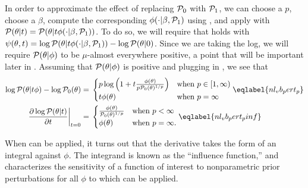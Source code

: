 In order to approximate the effect of replacing $\mathcal{P}_{0}$ with $\mathcal{P}_{1}$, we can
choose a $p$, choose a $\beta$, compute the corresponding $\phi(\cdot \vert
\beta, \mathcal{P}_{1})$ using , and apply  with
$\mathcal{P}(\theta \vert t) = \mathcal{P}(\theta \vert t \phi(\cdot \vert \beta, \mathcal{P}_{1}))$. To
do so, we will require that  holds with $\psi(\theta, t) =
\log \mathcal{P}(\theta \vert t \phi(\cdot \vert \beta, \mathcal{P}_{1})) - \log \mathcal{P}(\theta \vert
0)$.  Since we are taking the log, we will require $\mathcal{P}(\theta \vert \phi)$
to be $\mu$-almost everywhere positive, a point that will be important later in
. Assuming that $\mathcal{P}(\theta \vert \phi)$ is positive and
plugging in , we see that
%
\begin{align}
%
\logp(\theta \vert \t \phi) - \log \pbase(\theta) ={}&
\begin{cases}
    p \log\left(1 + \t \frac{\phi(\theta)}{p \pbase(\theta)^{1/p}}\right)
    & \textrm{when }p \in [1, \infty) \\
    \t \phi(\theta)
    & \textrm{when }p = \infty
%
\end{cases}  \eqlabel{nl_vb_pert_p}\\
%
\fracat{\partial \log \p(\theta \vert \t)}{\partial \t}{\t=0} ={}&
\begin{cases}
   \frac{\phi(\theta)}{\pbase(\theta)^{1/p}}
   & \textrm{when }p < \infty \\
   \phi(\theta)
   & \textrm{when }p = \infty.
\end{cases}\eqlabel{nl_vb_pert_pinf}
%
\end{align}

When  can be applied,  it turns out that the derivative takes
the form of an integral against $\phi$.  The integrand is known as the
``influence function,'' and characterizes the sensitivity of a function of
interest to nonparametric prior perturbations for all $\phi$ to which
 can be applied.


